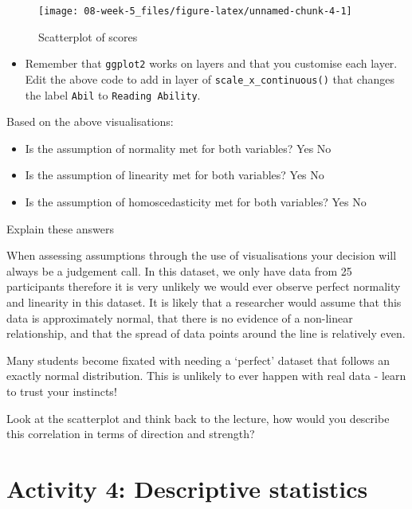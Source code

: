 \documentclass[]{book}
\providecommand{\tightlist}{%
  \setlength{\itemsep}{0pt}\setlength{\parskip}{0pt}}
\begin{document}
\begin{figure}

{\centering \texttt{[image: 08-week-5\_files/figure-latex/unnamed-chunk-4-1]} 

}

\caption{Scatterplot of scores}\label{fig:unnamed-chunk-4}
\end{figure}

\begin{itemize}
\tightlist
\item
  Remember that \texttt{ggplot2} works on layers and that you customise each layer. Edit the above code to add in layer of \texttt{scale\_x\_continuous()} that changes the label \texttt{Abil} to \texttt{Reading\ Ability}.
\end{itemize}

Based on the above visualisations:

\begin{itemize}
\tightlist
\item
  Is the assumption of normality met for both variables? Yes No
\item
  Is the assumption of linearity met for both variables? Yes No
\item
  Is the assumption of homoscedasticity met for both variables? Yes No
\end{itemize}

Explain these answers

When assessing assumptions through the use of visualisations your decision will always be a judgement call. In this dataset, we only have data from 25 participants therefore it is very unlikely we would ever observe perfect normality and linearity in this dataset. It is likely that a researcher would assume that this data is approximately normal, that there is no evidence of a non-linear relationship, and that the spread of data points around the line is relatively even.

Many students become fixated with needing a `perfect' dataset that follows an exactly normal distribution. This is unlikely to ever happen with real data - learn to trust your instincts!

Look at the scatterplot and think back to the lecture, how would you describe this correlation in terms of direction and strength?

\hypertarget{activity-4-descriptive-statistics-1}{%
\section{Activity 4: Descriptive statistics}\label{activity-4-descriptive-statistics-1}}
\end{document}
